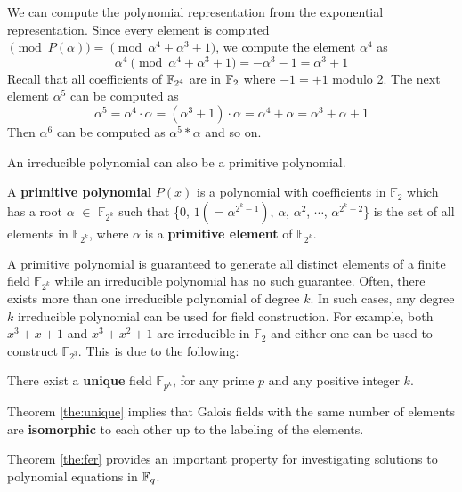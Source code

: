 \begin{Example}
We can compute the polynomial representation from the exponential representation.
Since every element is computed $\pmod{P(\alpha)} = \pmod{\alpha^4+\alpha^3+1}$, 
we compute the element $\alpha^{4}$ as 
\begin{equation}
\alpha^{4} \pmod{ \alpha^4+\alpha^3+1} = -\alpha^3 - 1 = \alpha^3+1
\end{equation}
Recall that all coefficients of ${\mathbb{F}}_{2^4}$ 
are in ${\mathbb{F}}_{2}$ where $-1 = +1$ modulo 2.
The next element $\alpha^{5}$ can be computed as 
\begin{equation}
\alpha^{5} = \alpha^{4}\cdot \alpha = (\alpha^3+1)\cdot \alpha = \alpha^4+\alpha = \alpha^3+\alpha+1 
\end{equation}
Then $\alpha^6$ can be computed as $\alpha^{5}*\alpha$ and so on.
\end{Example}

An irreducible polynomial can also be a primitive polynomial.

\begin{Definition}
A {\bf primitive polynomial} $P(x)$ is a polynomial with coefficients in $\mathbb{F}_2$ 
which has a root $\alpha$ $\in$ $\mathbb{F}_{2^k}$
such that \{$0$, $1(=\alpha^{{2^k}-1})$, $\alpha$, $\alpha^2$, $\cdots$, $\alpha^{2^k-2}$\} is the set of 
all elements in $\mathbb{F}_{2^k}$, 
where $\alpha$ is a {\bf primitive element} of $\mathbb{F}_{2^k}$. 
\end{Definition}

A primitive polynomial is guaranteed to generate all distinct elements 
of a finite field $\mathbb{F}_{2^k}$ while an irreducible polynomial
has no such guarantee.
Often, there exists more than one irreducible polynomial of degree $k$.
In such cases, any degree $k$ irreducible polynomial can be 
used for field construction. For example, both $x^3+x+1$ and $x^3+x^2+1$ 
are irreducible in $\mathbb{F}_2$ and either one can be used
to construct $\mathbb{F}_{2^3}$. This is due to the following:

\begin{Theorem}\label{the:unique}
There exist a {\bf unique} field $\mathbb{F}_{p^k}$, for any prime $p$ and any positive integer $k$.
\end{Theorem}

Theorem \ref{the:unique} implies that Galois fields with the same number of elements are 
{\bf isomorphic} to each other up to the labeling of the elements. 

Theorem \ref{the:fer} provides an important property for investigating solutions to
polynomial equations in ${\mathbb{F}}_{q}$.

